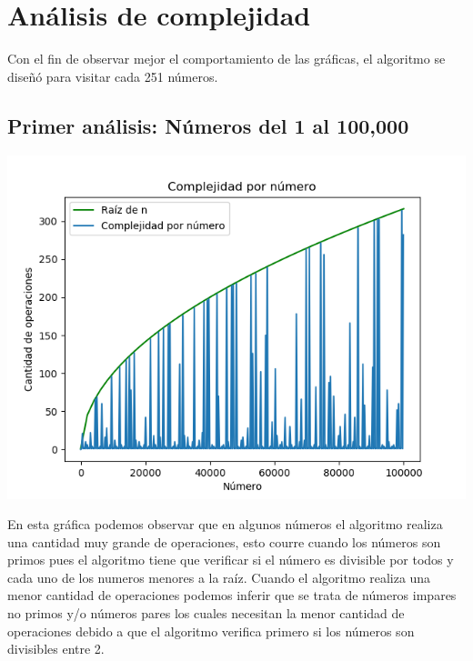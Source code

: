 \section{An\'alisis de complejidad}
Con el fin de observar mejor el comportamiento de las gr\'aficas, el algoritmo se dise\~n\'o para visitar cada 251 n\'umeros.

\subsection{Primer an\'alisis: N\'umeros del 1 al 100,000}
\begin{center}
	\includegraphics[scale=0.6]{Numeros1al100000.png}
\end{center}
En esta gr\'afica podemos observar que en algunos n\'umeros el algoritmo realiza una cantidad muy grande de operaciones, esto courre cuando los n\'umeros son primos pues el algoritmo tiene que verificar si el n\'umero es divisible por todos y cada uno de los numeros menores a la ra\'iz. Cuando el algoritmo realiza una menor cantidad de operaciones podemos inferir que se trata de n\'umeros impares no primos y/o n\'umeros pares los cuales necesitan la menor cantidad de operaciones debido a que el algoritmo verifica primero si los n\'umeros son divisibles entre 2.


